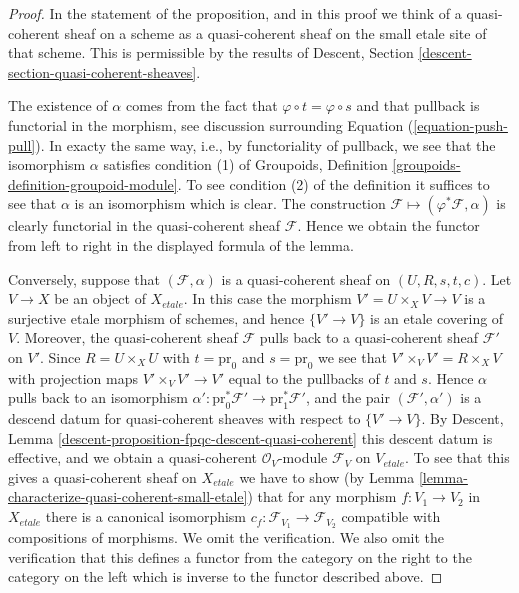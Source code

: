 \begin{proof}
In the statement of the proposition, and in this proof we think of a
quasi-coherent sheaf on a scheme as a quasi-coherent sheaf on the small
etale site of that scheme. This is permissible by the results of
Descent, Section \ref{descent-section-quasi-coherent-sheaves}.

\medskip\noindent
The existence of $\alpha$ comes from the fact that
$\varphi \circ t = \varphi \circ s$ and that pullback is
functorial in the morphism, see discussion surrounding
Equation (\ref{equation-push-pull}). In exacty the same way, i.e., by
functoriality of pullback, we see that the isomorphism $\alpha$ satisfies
condition (1) of
Groupoids, Definition \ref{groupoids-definition-groupoid-module}.
To see condition (2) of the definition it suffices to see that $\alpha$
is an isomorphism which is clear. The construction
$\mathcal{F} \mapsto (\varphi^*\mathcal{F}, \alpha)$
is clearly functorial in the quasi-coherent sheaf $\mathcal{F}$.
Hence we obtain the functor from left to right in the displayed
formula of the lemma.

\medskip\noindent
Conversely, suppose that $(\mathcal{F}, \alpha)$ is a quasi-coherent
sheaf on $(U, R, s, t, c)$. Let $V \to X$ be an object of $X_{etale}$.
In this case the morphism $V' = U \times_X V \to V$ is a surjective etale
morphism of schemes, and hence $\{V' \to V\}$ is an etale
covering of $V$. Moreover, the quasi-coherent sheaf $\mathcal{F}$
pulls back to a quasi-coherent sheaf $\mathcal{F}'$ on $V'$.
Since $R = U \times_X U$ with $t = \text{pr}_0$ and $s = \text{pr}_0$
we see that $V' \times_V V' = R \times_X V$ with projection maps
$V' \times_V V' \to V'$ equal to the pullbacks of $t$ and $s$. Hence
$\alpha$ pulls back to an isomorphism
$\alpha' : \text{pr}_0^*\mathcal{F}' \to \text{pr}_1^*\mathcal{F}'$, and
the pair $(\mathcal{F}', \alpha')$ is a descend datum for quasi-coherent
sheaves with respect to $\{V' \to V\}$. By
Descent, Lemma \ref{descent-proposition-fpqc-descent-quasi-coherent}
this descent datum is effective, and we obtain a quasi-coherent
$\mathcal{O}_V$-module $\mathcal{F}_V$ on $V_{etale}$.
To see that this gives a quasi-coherent sheaf on $X_{etale}$ we have
to show (by
Lemma \ref{lemma-characterize-quasi-coherent-small-etale})
that for any morphism $f : V_1 \to V_2$ in $X_{etale}$
there is a canonical isomorphism
$c_f : \mathcal{F}_{V_1} \to \mathcal{F}_{V_2}$
compatible with compositions of morphisms. We omit the verification.
We also omit the verification that this defines a functor from the
category on the right to the category on the left which is inverse
to the functor described above.
\end{proof}




